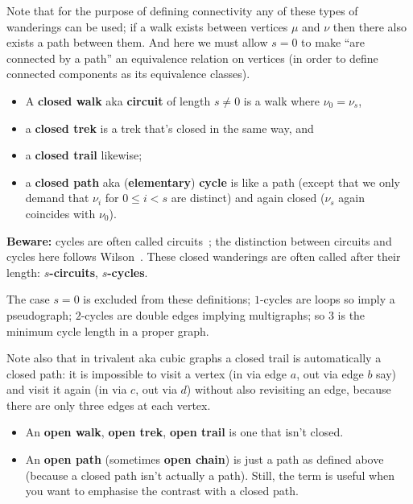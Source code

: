 \documentclass[12pt]{article}
\let\le\leqslant
\begin{document}
Note that for the purpose of defining connectivity any of these types of wanderings can be used; if a walk exists between vertices $\mu$ and $\nu$ then there also exists a path between them. And here we must allow $s=0$ to make ``are connected by a path'' an equivalence relation on vertices (in order to define
connected components as its equivalence classes).
%
\begin{itemize}

\item A {\bf closed walk} aka {\bf circuit} of length $s\ne0$ is a walk where
      $\nu_0 = \nu_s$, 

\item a {\bf closed trek} is a trek that's closed in the same way, and 

\item a {\bf closed trail} likewise;

\item a {\bf closed path} aka ({\bf elementary}) {\bf cycle} is like a path
      (except that we only demand that $\nu_i$ for $0\le i\lt s$ are distinct)
      and again closed ($\nu_s$ again coincides with $\nu_0$).

\end{itemize}
%
{\bf Beware:} cycles are often called circuits~\cite{Cam94}; the distinction between circuits and cycles here follows Wilson~\cite{Wil02}. These closed wanderings are often called after their length: {\bf $s$-circuits}, {\bf $s$-cycles}.

The case $s=0$ is excluded from these definitions; $1$-cycles are loops so imply a pseudograph; $2$-cycles are double edges implying multigraphs; so $3$ is the minimum cycle length in a proper graph.

Note also that in trivalent aka cubic graphs a closed trail is automatically a closed path: it is impossible to visit a vertex (in via edge $a$, out via edge $b$ say) and visit it again (in via $c$, out via $d$) without also revisiting an edge, because there are only three edges at each vertex.
%
\begin{itemize}

\item An {\bf open walk}, {\bf open trek}, {\bf open trail} is one that isn't
      closed.

\item An {\bf open path} (sometimes {\bf open chain}) is just a path as
      defined above (because a closed path isn't actually a path). Still,
      the term is useful when you want to emphasise the contrast with a
      closed path.

\end{itemize}
\end{document}
